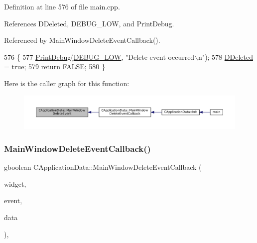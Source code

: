 Definition at line 576 of file main.\+cpp.



References D\+Deleted, D\+E\+B\+U\+G\+\_\+\+L\+OW, and Print\+Debug.



Referenced by Main\+Window\+Delete\+Event\+Callback().


\begin{DoxyCode}
576                                                                                   \{
577     \hyperlink{Debug_8h_aa5f00f5537c9760f6ae1782460748ab9}{PrintDebug}(\hyperlink{Debug_8h_a3a5f3fc09784650d8388cb854882f840}{DEBUG\_LOW}, \textcolor{stringliteral}{"Delete event occurred\(\backslash\)n"});   
578     \hyperlink{classCApplicationData_a0a8651f95f3d48befd6e02a286ecdc82}{DDeleted} = \textcolor{keyword}{true};
579     \textcolor{keywordflow}{return} FALSE;    
580 \}
\end{DoxyCode}
Here is the caller graph for this function\+:\nopagebreak
\begin{figure}[H]
\begin{center}
\leavevmode
\includegraphics[width=350pt]{classCApplicationData_afd73780d7dca117edbe341cb3c908c04_icgraph}
\end{center}
\end{figure}
\hypertarget{classCApplicationData_a4b2110c03e030cf11b733955963f8854}{}\label{classCApplicationData_a4b2110c03e030cf11b733955963f8854} 
\subsubsection{\texorpdfstring{Main\+Window\+Delete\+Event\+Callback()}{MainWindowDeleteEventCallback()}}
{\footnotesize\ttfamily gboolean C\+Application\+Data\+::\+Main\+Window\+Delete\+Event\+Callback (\begin{DoxyParamCaption}\item[{Gtk\+Widget $\ast$}]{widget,  }\item[{Gdk\+Event $\ast$}]{event,  }\item[{gpointer}]{data }\end{DoxyParamCaption})\hspace{0.3cm}{\ttfamily [static]}, {\ttfamily [protected]}}



